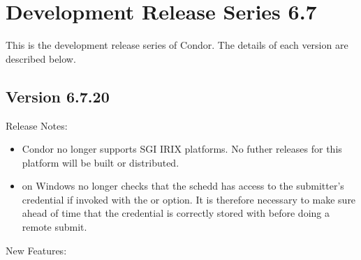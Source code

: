 \section{\label{sec:History-6-7}Development Release Series 6.7}

This is the development release series of Condor.
The details of each version are described below.



\subsection*{\label{sec:New-6-7-20}Version 6.7.20}

\noindent Release Notes:

\begin{itemize}

\item Condor no longer supports SGI IRIX platforms.  No futher
releases for this platform will be built or distributed.

\item {} on Windows no longer checks that the schedd has
access to the submitter's credential if invoked with the  or
 option. It is therefore necessary to make sure ahead of time
that the credential is correctly stored with 
before doing a remote submit.

\end{itemize}


\noindent New Features:

